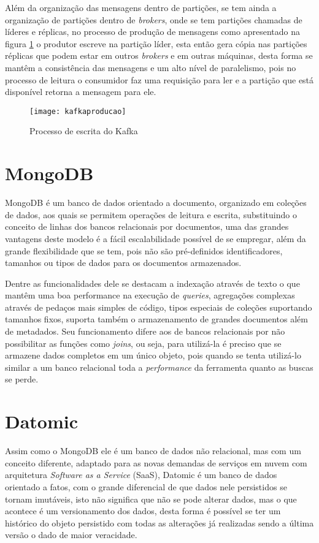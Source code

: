 Além da organização das mensagens dentro de partições, se tem ainda a organização de partições dentro de \textit{brokers}, onde se tem partições  chamadas de líderes e réplicas, no processo de produção de mensagens como apresentado na figura \ref{fig:kafkaproducao} o produtor escreve na partição líder, esta então gera cópia nas partições réplicas que podem estar em outros \textit{brokers} e em outras máquinas, desta forma se mantêm a consistência das mensagens e um alto nível de paralelismo, pois no processo de leitura o consumidor faz uma requisição para ler e a partição que está disponível retorna a mensagem para ele.~\cite{kafka}

\begin{figure}[!h]
\caption{\label{fig:kafkaproducao} Processo de escrita do Kafka}
\begin{center}
\texttt{[image: kafkaproducao]}
\end{center}
\end{figure}

\section{MongoDB}
MongoDB é um banco de dados orientado a documento, organizado em coleções de dados, aos quais se permitem operações de leitura e escrita, substituindo o conceito de linhas dos bancos relacionais por documentos, uma das grandes vantagens deste modelo é a fácil escalabilidade possível de se empregar, além da grande flexibilidade que se tem, pois não são pré-definidos identificadores, tamanhos ou tipos de dados para os documentos armazenados.

Dentre as funcionalidades dele se destacam a indexação através de texto o que mantêm uma boa performance na execução de \textit{queries}, agregações complexas através de pedaços mais simples de código, tipos especiais de coleções suportando tamanhos fixos, suporta também o armazenamento de grandes documentos além de metadados. Seu funcionamento difere aos de bancos relacionais por não possibilitar as funções como \textit{joins}, ou seja, para utilizá-la é preciso que se armazene dados completos em um único objeto, pois quando se tenta utilizá-lo similar a um banco relacional toda a \textit{performance} da ferramenta quanto as buscas se perde.~\cite{chodorow2013mongodb}

\section{Datomic}
Assim como o MongoDB ele é um banco de dados não relacional, mas com um conceito diferente, adaptado para as novas demandas de serviços em nuvem com arquitetura \textit{Software as a Service} (SaaS), Datomic é um banco de dados orientado a fatos, com o grande diferencial de que dados nele persistidos se tornam imutáveis, isto não significa que não se pode alterar dados, mas o que acontece é um versionamento dos dados, desta forma é possível se ter um histórico do objeto persistido com todas as alterações já realizadas sendo a última versão o dado de maior veracidade.  

